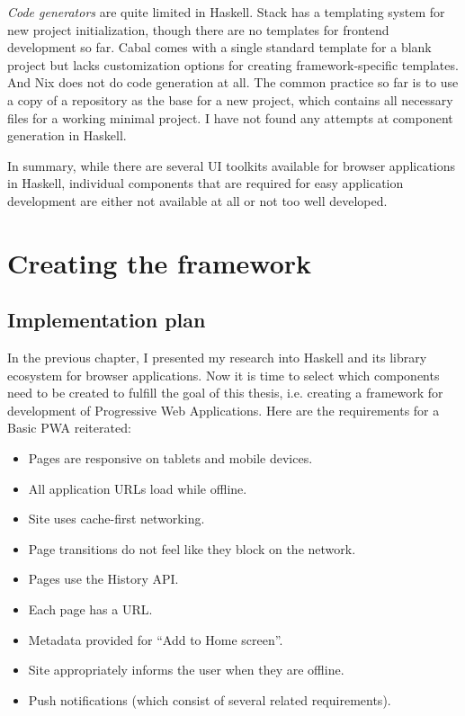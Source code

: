 \documentclass[english,zadani,odsaz]{fitthesis}
\begin{document}
\emph{Code generators} are quite limited in Haskell. Stack has a templating system for
new project initialization, though there are no templates for frontend
development so far. Cabal comes with a single standard template for a blank
project but lacks customization options for creating framework-specific
templates. And Nix does not do code generation at all. The common practice so
far is to use a copy of a repository as the base for a new project, which
contains all necessary files for a working minimal project. I have not found any
attempts at component generation in Haskell.

In summary, while there are several UI toolkits available for browser
applications in Haskell, individual components that are required for easy
application development are either not available at all or not too well
developed.

\chapter{Creating the framework}
\label{sec:org0cf294f}
\section{Implementation plan}
\label{sec:org746e531}
In the previous chapter, I presented my research into Haskell and its library
ecosystem for browser applications. Now it is time to select which components
need to be created to fulfill the goal of this thesis, i.e. creating a framework
for development of Progressive Web Applications. Here are the requirements for a
Basic PWA reiterated:

\begin{itemize}
\item Pages are responsive on tablets and mobile devices.
\item All application URLs load while offline.
\item Site uses cache-first networking.
\item Page transitions do not feel like they block on the network.
\item Pages use the History API.
\item Each page has a URL.
\item Metadata provided for ``Add to Home screen''.
\item Site appropriately informs the user when they are offline.
\item Push notifications (which consist of several related requirements).
\end{itemize}
\end{document}

